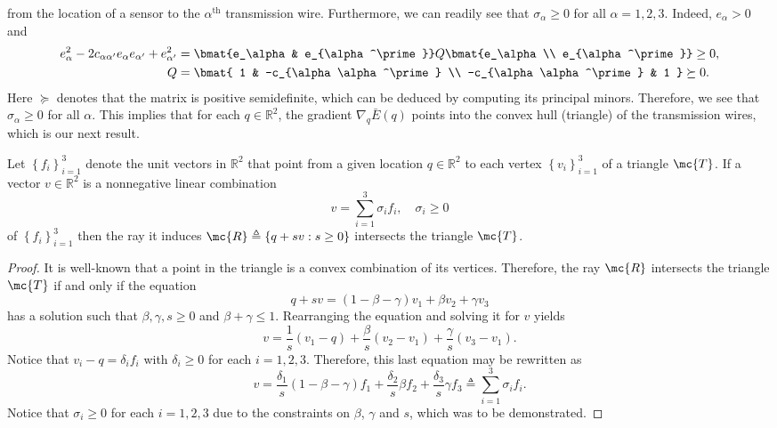 from the location of a sensor to the $\alpha^{\text{th}}$ transmission wire.
Furthermore, we can readily see that $\sigma_\alpha \geq 0$ for all $\alpha = 1,
2, 3$. Indeed, $e_\alpha > 0$ and
%
\begin{align*} 
    e_\alpha^2 - 2c_{\alpha \alpha^\prime}e_\alpha e_{\alpha^\prime}
    + e_{\alpha^\prime}^2 &= \bmat{e_\alpha & e_{\alpha^\prime}} Q \bmat{e_\alpha
                                           \\ e_{\alpha^\prime}} \geq 0, \\
    Q &= \bmat{
        1 & -c_{\alpha \alpha^\prime} \\ -c_{\alpha \alpha^\prime} & 1
    } \succeq 0.
\end{align*}
%
Here $\succeq$ denotes that the matrix is positive semidefinite, which can be
deduced by computing its principal minors. Therefore, we see that $\sigma_\alpha
\geq 0$ for all $\alpha$. This implies that for
each $q \in \mathbb{R}^2$, the gradient $\nabla_q\bar{E}(q)$ points into the
convex hull (triangle) of the transmission wires, which is our next result. 
\begin{prop}
    Let $\left\{f_i\right\}_{i=1}^3$ denote the unit vectors in $\mathbb{R}^2$
    that point from a given location $q \in \mathbb{R}^2$ to each vertex
    $\left\{v_i\right\}_{i=1}^3$ of a triangle $\mc{T}$. If a vector $v \in
    \mathbb{R}^2$ is a nonnegative linear combination \[ v = \sum_{i=1}^3
    \sigma_i f_i, \quad \sigma_i \geq 0 \] of $\left\{ f_i \right\}_{i=1}^3$
    then the ray it induces $\mc{R} \triangleq \left\{q + sv: s \geq 0\right\}$
    intersects the triangle $\mc{T}$.
\end{prop}

\begin{proof}
    It is well-known that a point in the triangle is a convex combination of its
    vertices. Therefore, the ray $\mc{R}$ intersects the triangle $\mc{T}$ if
    and only if the equation \[ q + sv = (1 - \beta - \gamma)v_1 + \beta v_2 +
    \gamma v_3 \] has a solution such that $\beta, \gamma, s \geq 0$ and $\beta 
    + \gamma \leq 1$. Rearranging the equation and solving it for $v$ yields 
    \[ v = \frac{1}{s}(v_1 - q) + \frac{\beta}{s}(v_2-v_1) +
    \frac{\gamma}{s}(v_3-v_1). \] Notice that $v_i - q = \delta_i f_i$ with
    $\delta_i \geq 0$ for each $i = 1, 2, 3$. Therefore, this last equation may
    be rewritten as \[ v = \frac{\delta_1}{s}(1-\beta-\gamma)f_1 +
    \frac{\delta_2}{s}\beta f_2 + \frac{\delta_3}{s}\gamma f_3 \triangleq
    \sum_{i=1}^3 \sigma_i f_i. \] Notice that $\sigma_i \geq 0$ for each $i = 1,
    2, 3$ due to the constraints on $\beta$, $\gamma$ and $s$, which was to be
    demonstrated.
\end{proof}

